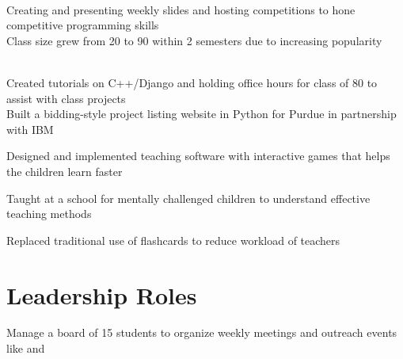 \documentclass[]{resume_openfont}
\begin{document}
\begin{minipage}[t]{0.66\textwidth}
\begin{tightemize}
\item {}  \\ 
\textbullet{} Creating and presenting weekly slides and hosting competitions to hone competitive programming skills \\
\textbullet{} Class size grew from 20 to 90 within 2 semesters due to increasing popularity\\
\item {}\\
\textbullet{} Created tutorials on C++/Django and holding office hours for class of 80 to assist with class projects \\
\textbullet{} Built a bidding-style project listing website in Python for Purdue in partnership with IBM \\
\end{tightemize}
\sectionsep

\begin{tightemize}
\item Designed and implemented teaching software with interactive games that helps the children learn faster
\item Taught at a school for mentally challenged children to understand effective teaching methods
\item Replaced traditional use of flashcards to reduce workload of teachers
\end{tightemize}
\sectionsep


\section{Leadership Roles}

\begin{tightemize}
\item Manage a board of 15 students to organize weekly meetings and outreach events like  and 
\end{tightemize}
\sectionsep


\end{minipage} 
\end{document}
